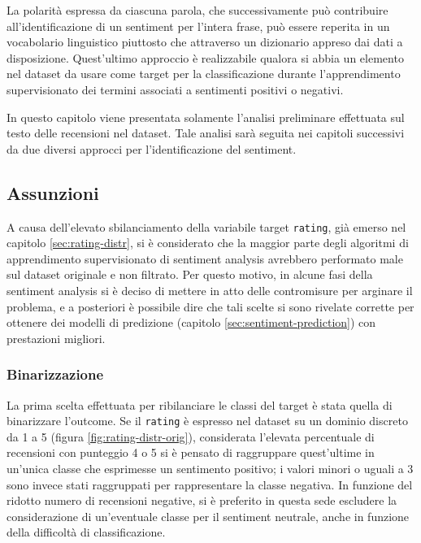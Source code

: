 \documentclass[hidelinks, 12pt]{article}
\begin{document}
La polarità espressa da ciascuna parola, che successivamente può contribuire all'identificazione di un sentiment per l'intera frase, può essere reperita in un vocabolario linguistico piuttosto che attraverso un dizionario appreso dai dati a disposizione. Quest'ultimo approccio è realizzabile qualora si abbia un elemento nel dataset da usare come target per la classificazione durante l'apprendimento supervisionato dei termini associati a sentimenti positivi o negativi.

In questo capitolo viene presentata solamente l'analisi preliminare effettuata sul testo delle recensioni nel dataset. Tale analisi sarà seguita nei capitoli successivi da due diversi approcci per l'identificazione del sentiment.



\subsection{Assunzioni}

A causa dell'elevato sbilanciamento della variabile target \texttt{rating}, già emerso nel capitolo \ref{sec:rating-distr}, si è considerato che la maggior parte degli algoritmi di apprendimento supervisionato di sentiment analysis avrebbero performato male sul dataset originale e non filtrato. Per questo motivo, in alcune fasi della sentiment analysis si è deciso di mettere in atto delle contromisure per arginare il problema, e a posteriori è possibile dire che tali scelte si sono rivelate corrette per ottenere dei modelli di predizione (capitolo \ref{sec:sentiment-prediction}) con prestazioni migliori.


\subsubsection{Binarizzazione}

La prima scelta effettuata per ribilanciare le classi del target è stata quella di binarizzare l'outcome. Se il \texttt{rating} è espresso nel dataset su un dominio discreto da 1 a 5 (figura \ref{fig:rating-distr-orig}), considerata l'elevata percentuale di recensioni con punteggio 4 o 5 si è pensato di raggruppare quest'ultime in un'unica classe che esprimesse un sentimento positivo; i valori minori o uguali a 3 sono invece stati raggruppati per rappresentare la classe negativa. In funzione del ridotto numero di recensioni negative, si è preferito in questa sede escludere la considerazione di un'eventuale classe per il sentiment neutrale, anche in funzione della difficoltà di classificazione.
\end{document}
